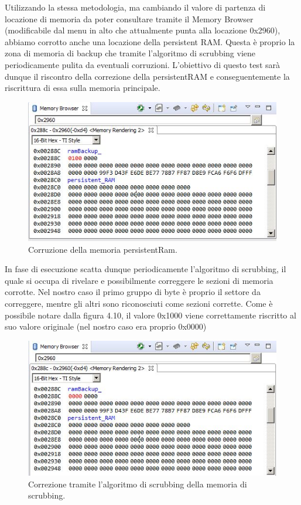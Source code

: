 \documentclass[LaM,binding=0.6cm,oneside]{../sapthesis}
\begin{document}
Utilizzando la stessa metodologia, ma cambiando il valore di partenza di locazione di memoria da poter consultare tramite il Memory Browser (modificabile dal menu in alto che attualmente punta alla locazione 0x2960), abbiamo corrotto anche una locazione della persistent RAM. 
Questa è proprio la zona di memoria di backup che tramite l'algoritmo di scrubbing viene periodicamente pulita da eventuali corruzioni. L'obiettivo di questo test sarà dunque il riscontro della correzione della persistentRAM e conseguentemente la riscrittura di essa sulla memoria principale.
\begin{figure}[htbp]
\centerline{\includegraphics[scale=0.8]{examples/5_PersistentRamCorruzione.JPG}}
\caption{Corruzione della memoria persistentRam.}
\label{fig}
\end{figure}
\newline
In fase di esecuzione scatta dunque periodicamente l'algoritmo di scrubbing, il quale si occupa di rivelare e possibilmente correggere le sezioni di memoria corrotte. Nel nostro caso il primo gruppo di byte è proprio il settore da correggere, mentre gli altri sono riconosciuti come sezioni corrette. Come è possibile notare dalla figura 4.10, il valore 0x1000 viene correttamente riscritto al suo valore originale (nel nostro caso era proprio 0x0000)

\begin{figure}[htbp]
\centerline{\includegraphics[scale=0.8]{examples/6_ScrubbingPersistentRamRiuscita.JPG}}
\caption{Correzione tramite l'algoritmo di scrubbing della memoria di scrubbing.}
\label{fig}
\end{figure}
\vspace{0.5cm}
\end{document}
